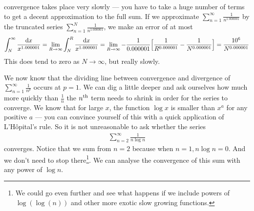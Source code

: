 \begin{eg}[The $p$ test:  $\sum\limits_{n=1}^\infty\frac{1}{n^p}$]
\begin{itemize}
convergence takes place very slowly --- you have to take a huge number
of terms to get a decent approximation to the full sum.
If we approximate $\sum_{n=1}^\infty\frac{1}{n^{1.000001}}$ by the
truncated series $\sum_{n=1}^N\frac{1}{n^{1.000001}}$, we make an error of
at most
\begin{align*}
\int_N^\infty \frac{\mathrm{d}x}{x^{1.000001}}
= \lim_{R\rightarrow\infty} \int_N^R \frac{\mathrm{d}x}{x^{1.000001}}
= \lim_{R\rightarrow\infty}- \frac{1}{0.000001}
          \Big[\frac{1}{R^{0.000001}}-\frac{1}{N^{0.000001}}\Big]
=\frac{10^6}{N^{0.000001}}
\end{align*}
This does tend to zero as $N\rightarrow\infty$, but really slowly.
\end{itemize}
\end{eg}
\goodbreak

We now know that the dividing line between convergence and divergence
of $\sum_{n=1}^\infty\frac{1}{n^p}$ occurs at $p=1$. We can dig
a little deeper and ask ourselves how much more quickly than
$\frac{1}{n}$ the $n^{\rm th}$ term
needs to shrink in order for the series to converge.
We know that for large $x$, the function $\log x$ is smaller than
$x^a$ for any positive $a$ --- you can convince yourself of this with
a quick application of L'H\^opital's rule. So it is not unreasonable
to ask whether the series
\begin{align*}
  \sum_{n=2}^\infty \frac{1}{n \log n}
\end{align*}
converges. Notice that we sum from $n=2$ because when $n=1, n\log n=0$.
And we don't need to stop there\footnote{We could go even further and see
what happens if we include powers of $\log(\log(n))$ and other more
exotic slow growing functions.}. We can analyse the convergence of
this sum with any power of $\log n$.


